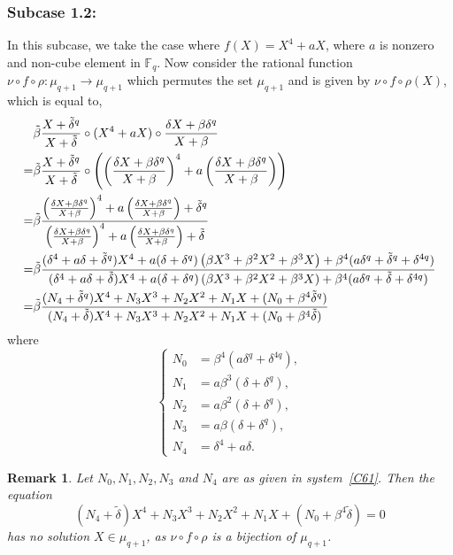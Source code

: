 \documentclass[12pt]{amsart}
\newtheorem{rmk}[thm]{Remark}
\numberwithin{equation}{section}
\theoremstyle{definition}
\newcommand{\F}{\mathbb F}
\begin{document}
\subsubsection*{\textbf{Subcase 1.2:}}\label{SS60}
In this subcase, we take the case where $f(X)=X^4+a X$, where $a$ is nonzero and non-cube element in $\F_q$. Now consider the rational function $\nu \circ f \circ \rho : \mu_{q+1} \rightarrow \mu_{q+1}$ which permutes the set $\mu_{q+1}$ and is given by $\nu \circ f \circ \rho(X)$, which is equal to,
\begin{align*}
& \Tilde{\beta}\frac{X+{\Tilde{\delta}}^q}{X+\Tilde{\delta}} \circ (X^4+a X) \circ \frac{\delta X+\beta \delta^q}{X+\beta}\\
= & \Tilde{\beta}\frac{X+{\Tilde{\delta}}^q}{X+\Tilde{\delta}} \circ \left( \left(\frac{\delta X+\beta \delta^q}{X+\beta}\right)^4+a \left(\frac{\delta X+\beta \delta^q}{X+\beta}\right)\right)\\
= & \Tilde{\beta}\frac{\left(\frac{\delta X+\beta \delta^q}{X+\beta}\right)^4+a \left(\frac{\delta X+\beta \delta^q}{X+\beta}\right)+{\Tilde{\delta}}^q}{ \left(\frac{\delta X+\beta \delta^q}{X+\beta}\right)^4+a \left(\frac{\delta X+\beta \delta^q}{X+\beta}\right)+\Tilde{\delta}}\\
= & \Tilde{\beta} \frac{(\delta^4+a\delta+{\Tilde{\delta}}^q)X^4+a(\delta+\delta^q)\left(\beta X^3+\beta^2X^2+\beta^3 X\right)+\beta^4(a\delta^q+{\Tilde{\delta}}^q+\delta^{4q})}{(\delta^4+a\delta+{\Tilde{\delta}})X^4+a(\delta+\delta^q)\left(\beta X^3+\beta^2X^2+\beta^3X\right)+\beta^4(a\delta^q+{\Tilde{\delta}}+\delta^{4q})}\\
= & \Tilde{\beta} \frac{(N_4+{\Tilde{\delta}}^q)X^4+N_3 X^3+N_2 X^2+N_1 X+(N_0+\beta^4 {\Tilde{\delta}}^q)} {(N_4+{\Tilde{\delta}})X^4+N_3 X^3+N_2 X^2+N_1 X+(N_0+\beta^4 {\Tilde{\delta}})}\\
\end{align*}
where
 \begin{equation}\label{C61}
  \begin{cases}
   N_0 &= \beta^4(a\delta^q+\delta^{4q}),\\
   N_1 &= a\beta^3(\delta+\delta^q),\\
   N_2 &= a\beta^2(\delta+\delta^q),\\
   N_3 &= a\beta(\delta+\delta^q),\\
   N_4 &= \delta^4+a\delta.
  \end{cases}
 \end{equation}
  \begin{rmk}\label{R61}
Let $N_0, N_1, N_2, N_3$ and $N_4$ are as given in system~\eqref{C61}. Then the equation
$$(N_4+{\tilde \delta})X^4 +N_3X^3+ N_2X^2+ N_1X+(N_0 + \beta^4{\tilde \delta}) = 0$$ has no solution $X \in \mu_{q+1}$, as $\nu \circ f \circ \rho$ is a bijection of $\mu_{q+1}$.
 \end{rmk}
 
\end{document}
